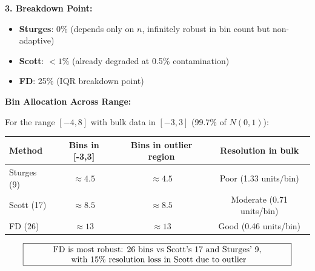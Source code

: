 \documentclass[12pt]{article}
\begin{document}
\begin{solution}
\textbf{3. Breakdown Point:}

\begin{itemize}
    \item \textbf{Sturges}: 0\% (depends only on \(n\), infinitely robust in bin count but non-adaptive)
    \item \textbf{Scott}: \(< 1\%\) (already degraded at 0.5\% contamination)
    \item \textbf{FD}: 25\% (IQR breakdown point)
\end{itemize}

\textbf{Bin Allocation Across Range:}

For the range \([-4, 8]\) with bulk data in \([-3, 3]\) (99.7\% of \(N(0,1)\)):

\begin{center}
\begin{tabular}{|l|c|c|c|}
\hline
\textbf{Method} & \textbf{Bins in [-3,3]} & \textbf{Bins in outlier region} & \textbf{Resolution in bulk} \\
\hline
Sturges (9) & \(\approx 4.5\) & \(\approx 4.5\) & Poor (1.33 units/bin) \\
Scott (17) & \(\approx 8.5\) & \(\approx 8.5\) & Moderate (0.71 units/bin) \\
FD (26) & \(\approx 13\) & \(\approx 13\) & Good (0.46 units/bin) \\
\hline
\end{tabular}
\end{center}

\[
\boxed{\parbox{0.9\textwidth}{\centering FD is most robust: 26 bins vs Scott's 17 and Sturges' 9, \\\ with 15\% resolution loss in Scott due to outlier}}
\]
\end{solution}
\end{document}

